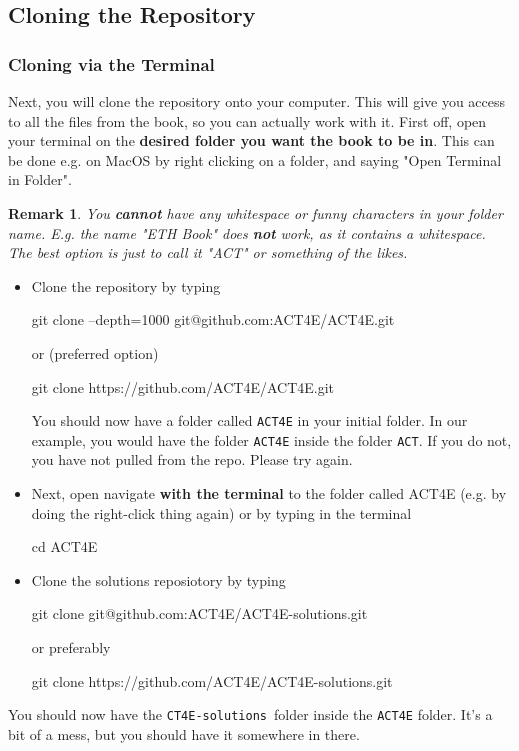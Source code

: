 \documentclass{article}
\newtheorem{remark}{Remark}
\begin{document}
\subsection{Cloning the Repository}

\subsubsection{Cloning via the Terminal}

Next, you will clone the repository onto your computer. This will give you access to all the files from the book, so you can actually work with it. First off, open your terminal on the \textbf{desired folder you want the book to be in}. This can be done e.g. on MacOS by right clicking on a folder, and saying "Open Terminal in Folder". 

\begin{remark}
    You \textbf{cannot} have any whitespace or funny characters in your folder name. E.g. the name "ETH Book" does \textbf{not} work, as it contains a whitespace. The best option is just to call it "ACT" or something of the likes.
\end{remark}
\begin{itemize}
    \item Clone the repository by typing
\begin{bashcode}
  git clone --depth=1000 git@github.com:ACT4E/ACT4E.git
\end{bashcode}
or (preferred option)
\begin{bashcode}
  git clone https://github.com/ACT4E/ACT4E.git
\end{bashcode}
You should now have a folder called \texttt{ACT4E} in your initial folder. In our example, you would have the folder \texttt{ACT4E} inside the folder \texttt{ACT}. If you do not, you have not pulled from the repo. Please try again.
\item Next, open navigate \textbf{with the terminal} to the folder called ACT4E (e.g. by doing the right-click thing again) or by typing in the terminal
\begin{bashcode}
  cd ACT4E
\end{bashcode}
\item Clone the solutions reposiotory by typing
\begin{bashcode}
 git clone git@github.com:ACT4E/ACT4E-solutions.git
\end{bashcode}
or preferably
\begin{bashcode}
  git clone https://github.com/ACT4E/ACT4E-solutions.git
\end{bashcode}
\end{itemize}
You should now have the \texttt{CT4E-solutions} folder inside the \texttt{ACT4E} folder. It's a bit of a mess, but you should have it somewhere in there.
\end{document}
